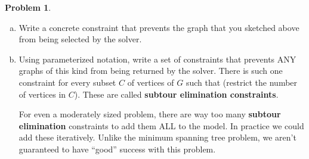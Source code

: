 \documentclass[11pt]{article}
\theoremstyle{definition}
\newtheorem{problem}{Problem}
\newcommand{\answerbox}[3]{%
  \fbox{%
    \begin{minipage}[#1]{#2}
      \hfill\vspace{#3}
    \end{minipage}
  }
}
\newcommand{\answerboxone}[2]{%
  \answerbox{#1}{6.0in}{#2} 
}
\newcommand{\wordbox}{\answerbox{c}{1.2in}{.7cm}}
\begin{document}
\begin{problem}
\begin{enumerate}[(a)]
\answerboxone{c}{5cm}


\item Write a concrete constraint that prevents the graph that you sketched above from being selected by the solver.  

\answerboxone{c}{3cm}

\item Using parameterized notation, write a set of constraints that prevents ANY graphs of this kind from being returned by the solver.  There is such one constraint for every subset $C$ of vertices of $G$ such that \wordbox (restrict the number of vertices in $C$).  These are called \textbf{subtour elimination constraints}.

\answerboxone{c}{3cm}

\begin{tcolorbox}
For even a moderately sized problem, there are way too many \textbf{subtour elimination} constraints to add them ALL to the model.  In practice we could add these iteratively. Unlike the minimum spanning tree problem, we aren't guaranteed to have ``good'' success with this problem.  
\end{tcolorbox}

\end{enumerate}

\end{problem}
\end{document}
